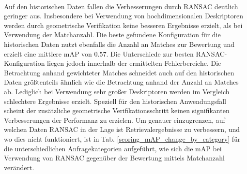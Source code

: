 \\
Auf den historischen Daten fallen die Verbesserungen durch RANSAC deutlich geringer aus. Insbesondere bei Verwendung von hochdimensionalen Deskriptoren werden durch geometrische Verifikation keine besseren Ergebnisse erzielt, als bei Verwendung der Matchanzahl. Die beste gefundene Konfiguration für die historischen Daten nutzt ebenfalls die Anzahl an Matches zur Bewertung und erzielt eine mittlere mAP von $0.57$. Die Unterschiede zur besten RANSAC-Konfiguration liegen jedoch innerhalb der ermittelten Fehlerbereiche. Die Betrachtung anhand gewichteter Matches schneidet auch auf den historischen Daten größtenteils ähnlich wie die Betrachtung anhand der Anzahl an Matches ab. Lediglich bei Verwendung sehr großer Deskriptoren werden im Vergleich schlechtere Ergebnisse erzielt. Speziell für den historischen Anwendungsfall scheint der zusätzliche geometrische Verifikationsschritt keinen signifikanten Verbesserungen der Performanz zu erzielen.
Um genauer einzugrenzen, auf welchen Daten RANSAC in der Lage ist Retrievalergebnisse zu verbessern, und wo dies nicht funktioniert, ist in Tab. \ref{scoring_mAP_change_by_category} für die unterschiedlichen Anfragekategorien aufgeführt, wie sich die mAP bei Verwendung von RANSAC gegenüber der Bewertung mittels Matchanzahl verändert.
\\
